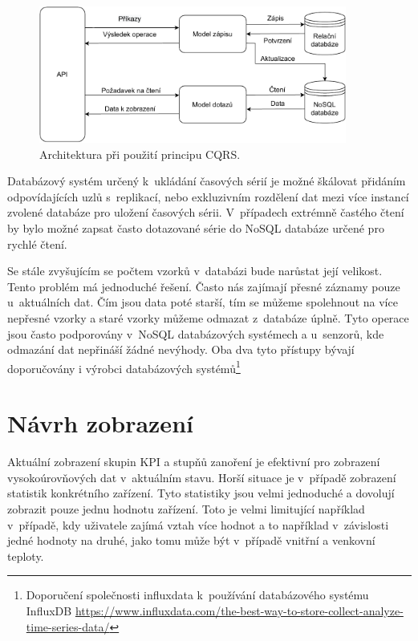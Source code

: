\begin{figure}[H]
\label{cqrs}
\begin{center}
    \includegraphics[width=0.9\textwidth]{obrazky-figures/csqr.pdf}
\end{center}
\caption{Architektura při použití principu CQRS.}
\end{figure}

Databázový systém určený k~ukládání časových sérií je možné škálovat přidáním odpovídajících uzlů s~replikací, nebo exkluzivním rozdělení dat mezi více instancí zvolené databáze pro uložení časových sérii. V~případech extrémně častého čtení by bylo možné zapsat často dotazované série do NoSQL databáze určené pro rychlé čtení.

Se stále zvyšujícím se počtem vzorků v~databázi bude narůstat její velikost. Tento problém má jednoduché řešení. Často nás zajímají přesné záznamy pouze u~aktuálních dat. Čím jsou data poté starší, tím se můžeme spolehnout na více nepřesné vzorky a staré vzorky můžeme odmazat z~databáze úplně. Tyto operace jsou často podporovány v~NoSQL databázových systémech a u~senzorů, kde odmazání dat nepřináší žádné nevýhody. Oba dva tyto přístupy bývají doporučovány i výrobci databázových systémů\footnote{Doporučení společnosti influxdata k~používání databázového systému InfluxDB \url{https://www.influxdata.com/the-best-way-to-store-collect-analyze-time-series-data/}}

\section{Návrh zobrazení}
\label{draft_dashboard}
Aktuální zobrazení skupin KPI a stupňů zanoření je efektivní pro zobrazení vysokoúrovňových dat v~aktuálním stavu. Horší situace je v~případě zobrazení statistik konkrétního zařízení. Tyto statistiky jsou velmi jednoduché a dovolují zobrazit pouze jednu hodnotu zařízení. Toto je velmi limitující například v~případě, kdy uživatele zajímá vztah více hodnot a to například v~závislosti jedné hodnoty na druhé, jako tomu může být v~případě vnitřní a venkovní teploty.

